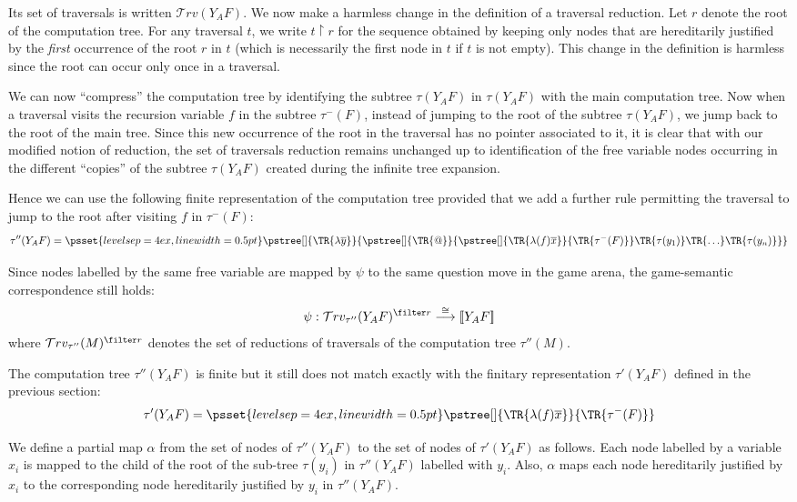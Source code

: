 \documentclass{article}
\newcommand{\sem}[1]{{[\![ #1 ]\!]}}
\newcommand{\travset}{\mathcal{T}rv}
\newcommand{\tree}[2][]{\pstree[#1]{\TR{#2}}}
\newcommand{\pssetcomptree}{\psset{levelsep=4ex,linewidth=0.5pt}}
\begin{document}
Its set of traversals is written $\travset(Y_A F)$. We now make a harmless change in the definition of a traversal reduction. Let $r$ denote the root of the computation tree. For any traversal $t$, we write $t \upharpoonright r$ for the sequence obtained by keeping only nodes that are hereditarily justified by the \emph{first} occurrence of the root $r$ in $t$ (which is necessarily the first node in $t$ if $t$ is not empty). This change in the definition is harmless since the root can occur only once in a traversal.

We can now ``compress'' the computation tree by identifying   the subtree $\tau(Y_A F)$ in $\tau(Y_A F)$ with the main computation tree. Now when a traversal visits the recursion variable $f$ in the subtree $\tau^-(F)$, instead of jumping to the root of the subtree $\tau(Y_A F)$, we jump back to the root of the main tree. Since this new occurrence of the root in the traversal has no pointer associated to it, it is clear that with our modified notion of reduction, the set of traversals reduction remains unchanged up to identification of the free variable nodes occurring in the different ``copies'' of the subtree $\tau(Y_A F)$ created during the infinite tree expansion.

Hence we can use the following finite representation of the computation tree provided that we add a further rule permitting  the traversal to jump to the root after visiting $f$ in  $\tau^-(F)$:
$$\tau''(Y_A F) = \pssetcomptree\tree{ \lambda \overline{y}}
     {  \tree{@}
               { \tree{ \lambda (f) \overline{x}}{\TR{\tau^-(F)}}
            \TR{\tau(y_1)}
            \TR{\ldots}
            \TR{\tau(y_n)}
                }
    }
$$

Since nodes labelled by the same free variable are mapped by $\psi$ to the same question move in the game arena, the game-semantic correspondence still holds:
$$ \psi : \travset_{\tau''}( Y_A F )^{\filter r} \stackrel{\cong}{\longrightarrow} \sem{Y_A F}$$
where $\travset_{\tau''}(M)^{\filter r}$ denotes the set of reductions of traversals of the computation tree $\tau''(M)$.


The computation tree $\tau''(Y_A F)$ is finite but it still does not match exactly with the finitary representation $\tau'(Y_A F)$ defined in the previous section:
$$\tau'(Y_A F) = \pssetcomptree\tree{ \lambda (f) \overline{x}}{\TR{\tau^-(F)}}
$$

We define a partial map $\alpha$ from the set of nodes of $\tau''(Y_A F)$ to the set of nodes of $\tau'(Y_A F)$ as follows. Each node labelled by a variable $x_i$ is mapped to the child of the root of the sub-tree $\tau(y_i)$ in $\tau''(Y_A F)$ labelled with $y_i$. Also, $\alpha$ maps each node hereditarily justified by $x_i$ to the corresponding node hereditarily justified by $y_i$ in $\tau''(Y_A F)$.
\end{document}
